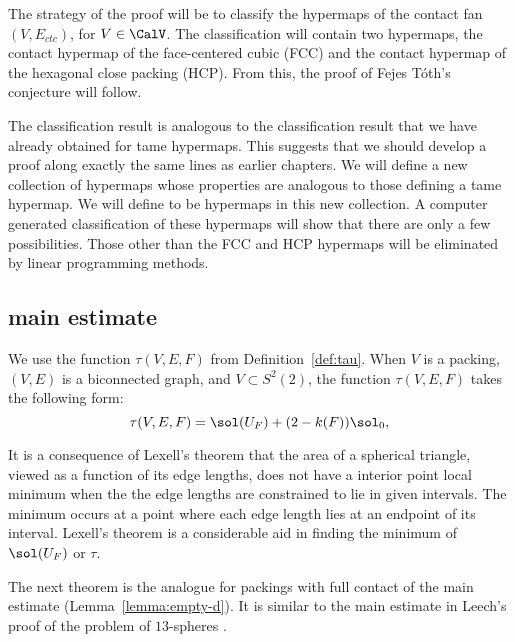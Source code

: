 The strategy of the proof will be to
classify the hypermaps of the contact fan $(V,E_{ctc})$, for $V\in \CalV$.  The classification will contain two
hypermaps, the contact hypermap of the face-centered cubic (FCC) and the contact hypermap of
the hexagonal close packing (HCP).  From this, the proof of Fejes T\'oth's conjecture will follow.

The classification result is analogous to the classification result that we have already obtained
for tame hypermaps.  This suggests that we should develop a proof along exactly the same lines
as earlier chapters.  We will define a new collection of hypermaps whose properties are
analogous to those defining a tame hypermap.  We will define 
to be hypermaps in this new collection.  A computer generated classification of these hypermaps
will show that there are only a few possibilities.  Those other than the FCC and HCP hypermaps
will be eliminated by linear programming methods.

\subsection{main estimate}




We use the function $\tau(V,E,F)$ from Definition~\ref{def:tau}.  When
$V$ is a packing, $(V,E)$ is a biconnected graph, and $V\subset S^2(2)$,
the function $\tau(V,E,F)$ takes the following form:
\begin{displaymath}
\tau(V,E,F) = \sol(U_F) + (2-k(F)) \sol_0,
\end{displaymath}

\begin{remark}
It is a consequence of Lexell's theorem that the area of a spherical triangle, viewed
as a function of its edge lengths, does not have a interior point local minimum when the
the edge lengths are constrained to lie in given intervals.  The minimum occurs at a point where
each edge length lies at an endpoint of its interval.  Lexell's theorem is a considerable
aid in finding the minimum of $\sol(U_F)$ or $\tau$.
\end{remark}

The next theorem is the analogue for packings with full contact of the
main estimate (Lemma~\ref{lemma:empty-d}).  It is similar to the
main estimate in Leech's proof of the problem of $13$-spheres
\cite{Leech:1956:MG}.


